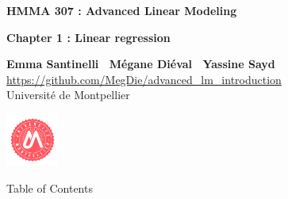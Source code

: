\documentclass[unknownkeysallowed]{beamer}
\begin{document}



\begin{frame}
\bigskip
\bigskip
\begin{center}{
\LARGE\color{marron}
\textbf{HMMA 307 : Advanced Linear Modeling}
\textbf{ }\\
\vspace{0.5cm}
}

\color{marron}
\textbf{Chapter 1 : Linear regression}
\end{center}

\vspace{0.5cm}

\begin{center}
\textbf{Emma Santinelli \ Mégane Diéval \ Yassine Sayd} \\
\vspace{0.1cm}
\url{https://github.com/MegDie/advanced_lm_introduction}\\
\vspace{0.5cm}
Université de Montpellier \\
\end{center}

\centering
\includegraphics[width=0.13\textwidth]{umontpellier_logo}
\end{frame}


\begin{frame}{Table of Contents}
\tableofcontents[hideallsubsections]
\end{frame}
\end{document}
